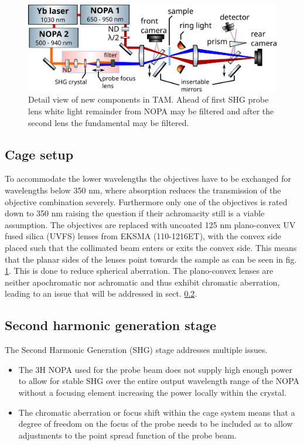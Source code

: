 \documentclass[twoside,openright]{scrreprt}
\begin{document}
\begin{figure}[h]\label{Fig:CageSetup}
\centering
\includegraphics[width=0.9\linewidth]{images/ComponentLibrary_svg/SHG-focusing-large.png}
\caption{Detail view of new components in TAM. Ahead of first SHG probe lens white light remainder from NOPA may be filtered and after the second lens the fundamental may be filtered.\label{fig:CageSetup}}
\end{figure}

\subsection{Cage setup}
To accommodate the lower wavelengths the objectives have to be exchanged for wavelengths below 350 nm, where absorption reduces the transmission of the objective combination severely. Furthermore only one of the objectives is rated down to 350 nm raising the question if their achromacity still is a viable assumption.\newline
The objectives are replaced with  uncoated 125 nm plano-convex UV fused silica (UVFS) lenses from EKSMA (110-1216ET), with the convex side placed such that the collimated beam enters or exits the convex side. This means that the planar sides of the lenses point towards the sample as can be seen in fig. \ref{fig:CageSetup}. This is done to reduce spherical aberration.
\newline
The plano-convex lenses are neither apochromatic nor achromatic and thus exhibit chromatic aberration, leading to an issue that will be addressed in sect. \ref{sec:SHG-Stage-desc}. \newline

\subsection{Second harmonic generation stage}\label{sec:SHG-Stage-desc}
The Second Harmonic Generation (SHG) stage addresses multiple issues. 
\begin{itemize}
\item The 3H NOPA used for the probe beam does not supply high enough power to allow for stable SHG over the entire output wavelength range of the NOPA without a focusing element increasing the power locally within the crystal. 
\item The chromatic aberration or focus shift within the cage system means that a degree of freedom on the focus of the probe needs to be included as to allow adjustments to the point spread function of the probe beam.
\end{itemize}
\end{document}
